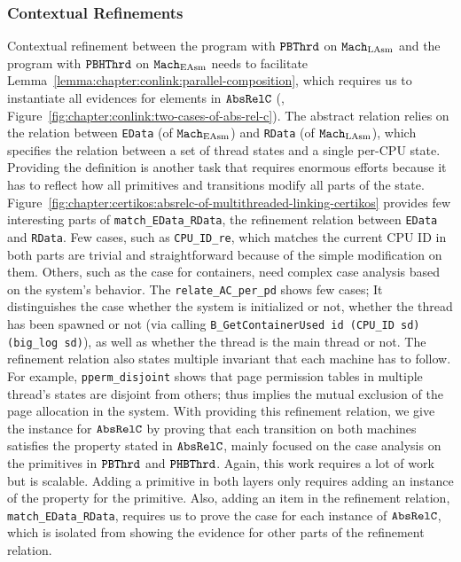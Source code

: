 \subsubsection{Contextual Refinements}
Contextual refinement between the program with ${{\mathrm{\texttt{PBThrd}}}}$ on ${\mathrm{\texttt{Mach}}}_{\mathrm{LAsm}}$ and 
 the program with ${\mathrm{\texttt{PBHThrd}}}$ on ${\mathrm{\texttt{Mach}}}_{\mathrm{EAsm}}$
 needs to facilitate Lemma~\ref{lemma:chapter:conlink:parallel-composition}, 
 which requires us to instantiate all evidences for elements in ${{\mathrm{\texttt{AbsRelC}}}}$ (\eg, 
 Figure~\ref{fig:chapter:conlink:two-cases-of-abs-rel-c}).
The abstract relation relies on the relation between  \lstinline$EData$ (of ${\mathrm{\texttt{Mach}}}_{\mathrm{EAsm}}$) and \lstinline$RData$ (of ${\mathrm{\texttt{Mach}}}_{\mathrm{LAsm}}$),
which specifies the relation between a set of thread states and a single per-CPU state. 
Providing the definition is another task that requires enormous efforts 
because it has to reflect how
all primitives and transitions modify all parts of the state.
Figure~\ref{fig:chapter:certikos:absrelc-of-multithreaded-linking-certikos} provides
few interesting parts of  \lstinline$match_EData_RData$, the refinement relation between \lstinline$EData$ and  \lstinline$RData$.
Few cases, such as \lstinline$CPU_ID_re$, which matches the current CPU ID in both parts are trivial and straightforward because of the simple modification on them. 
Others, such as the case for containers, need complex case analysis based on the system's behavior. 
The \lstinline$relate_AC_per_pd$ shows few cases;
It distinguishes the case whether the system is initialized or not, whether the thread has been
spawned or not (via calling \lstinline$B_GetContainerUsed id (CPU_ID sd) (big_log sd)$),
as well as whether the thread is the main thread or not.
The refinement relation also states multiple invariant
that each machine has to follow.
For example, \lstinline$pperm_disjoint$ shows
that page permission tables in multiple thread's states are disjoint from others; thus implies
the mutual exclusion of the page allocation in the system. 
With providing this refinement relation,
we give the instance for ${{\mathrm{\texttt{AbsRelC}}}}$ by proving 
that each transition on both machines satisfies the property stated in ${{\mathrm{\texttt{AbsRelC}}}}$,
mainly focused on the case analysis on the primitives in  ${{\mathrm{\texttt{PBThrd}}}}$ and ${{\mathrm{\texttt{PHBThrd}}}}$.
Again, this work requires a lot of work but is scalable.
Adding a primitive in both layers only requires adding an instance of the property for the primitive.
Also, adding an item in the refinement relation,   \lstinline$match_EData_RData$, requires 
us to prove the case for each instance of ${{\mathrm{\texttt{AbsRelC}}}}$,
which is isolated from showing the evidence for other parts of the refinement relation.

